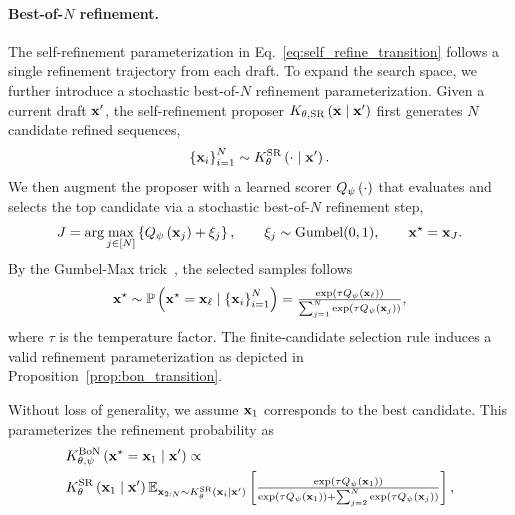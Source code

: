 \paragraph{Best-of-$N$ refinement.} 
The self-refinement parameterization in Eq.~\eqref{eq:self_refine_transition} follows a single refinement trajectory from each draft. 
To expand the search space, we further introduce a stochastic best-of-$N$ refinement parameterization. 
Given a current draft $\mathbf{x}'$, the self-refinement proposer $K_{\theta,\mathrm{SR}}\left(\mathbf{x}\mid\mathbf{x}'\right)$ first generates $N$ candidate refined sequences,
\begin{equation}
    \left\{\mathbf{x}_i\right\}_{i=1}^N\sim K_{\theta}^\mathrm{SR}\left(\cdot\mid \mathbf{x}'\right).
\end{equation}
We then augment the proposer with a learned scorer $Q_\psi\left(\cdot\right)$ that evaluates and selects the top candidate via a stochastic best-of-$N$ refinement step, 
\begin{equation}
    J=\arg\max_{j\in\left[N\right]}\left\{Q_\psi\left(\mathbf{x}_j\right)+\xi_j\right\},    \qquad
    \xi_j\sim\mathrm{Gumbel}(0,1), \qquad
    \mathbf{x}^\star=\mathbf{x}_J.
    \label{eq:gumbel_bon}
\end{equation}
By the Gumbel-Max trick~\citep{maddison2014sampling}, the selected samples follows
\begin{equation}
 \mathbf{x}^\star\sim \mathbb{P}\left(\mathbf{x}^\star=\mathbf{x}_\ell\mid \left\{\mathbf{x}_i\right\}_{i=1}^N\right)
    =
    \textstyle\frac{
        \exp\left(\tau Q_\psi\left(\mathbf{x}_\ell\right)\right)
    }{
        \sum_{j=1}^{N}
        \exp\left(\tau Q_\psi\left(\mathbf{x}_j\right)\right)
    },
    \label{eq:finite_candidate_softmax}
\end{equation}
where $\tau$ is the temperature factor. 
The finite-candidate selection rule induces a valid refinement parameterization as depicted in Proposition~\ref{prop:bon_transition}.
\begin{proposition}
\label{prop:bon_transition}
Without loss of generality, we assume $\mathbf{x}_1$ corresponds to the best candidate. This parameterizes the refinement probability as
\begin{equation}
    \begin{aligned}
        &K_{\theta, \psi}^\mathrm{BoN}\left(\mathbf{x}^\star=\mathbf{x}_1\mid \mathbf{x}'\right)\propto\\
        &
        K_{\theta}^\mathrm{SR}\left(\mathbf{x}_1\mid\mathbf{x}'\right) 
        \mathbb{E}_{\mathbf{x}_{2:N}\sim K_{\theta}^\mathrm{SR}\left(\mathbf{x}_i\mid\mathbf{x}'\right) }
        \left[\textstyle\frac{
        \exp\left(\tau Q_\psi\left(\mathbf{x}_1\right)\right)
    }{
        \exp\left(\tau Q_\psi\left(\mathbf{x}_1\right)\right)+\sum_{j=2}^{N}
        \exp\left(\tau Q_\psi\left(\mathbf{x}_j\right)
    \right)}\right],
     \label{eq:refine_prob_bon}
    \end{aligned}
\end{equation}
\end{proposition}
